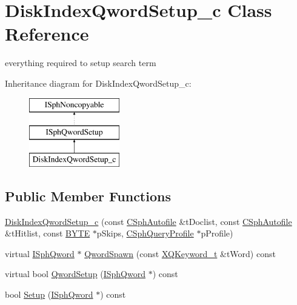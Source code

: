 \hypertarget{classDiskIndexQwordSetup__c}{\section{Disk\-Index\-Qword\-Setup\-\_\-c Class Reference}
\label{classDiskIndexQwordSetup__c}
}


everything required to setup search term  


Inheritance diagram for Disk\-Index\-Qword\-Setup\-\_\-c\-:\begin{figure}[H]
\begin{center}
\leavevmode
\includegraphics[height=3.000000cm]{classDiskIndexQwordSetup__c}
\end{center}
\end{figure}
\subsection*{Public Member Functions}
\begin{DoxyCompactItemize}
\item 
\hyperlink{classDiskIndexQwordSetup__c_a1c5f5c227e6eb09929a5b0db61a3e72c}{Disk\-Index\-Qword\-Setup\-\_\-c} (const \hyperlink{classCSphAutofile}{C\-Sph\-Autofile} \&t\-Doclist, const \hyperlink{classCSphAutofile}{C\-Sph\-Autofile} \&t\-Hitlist, const \hyperlink{sphinxstd_8h_a4ae1dab0fb4b072a66584546209e7d58}{B\-Y\-T\-E} $\ast$p\-Skips, \hyperlink{classCSphQueryProfile}{C\-Sph\-Query\-Profile} $\ast$p\-Profile)
\item 
virtual \hyperlink{classISphQword}{I\-Sph\-Qword} $\ast$ \hyperlink{classDiskIndexQwordSetup__c_a11b7dc43ca72a6216d02e821cee8897f}{Qword\-Spawn} (const \hyperlink{structXQKeyword__t}{X\-Q\-Keyword\-\_\-t} \&t\-Word) const 
\item 
virtual bool \hyperlink{classDiskIndexQwordSetup__c_ae6bfe5894e069d257a1f0d81a4056d78}{Qword\-Setup} (\hyperlink{classISphQword}{I\-Sph\-Qword} $\ast$) const 
\item 
bool \hyperlink{classDiskIndexQwordSetup__c_a92c7e92391cee6b04f6b924147d0762c}{Setup} (\hyperlink{classISphQword}{I\-Sph\-Qword} $\ast$) const 
\end{DoxyCompactItemize}
